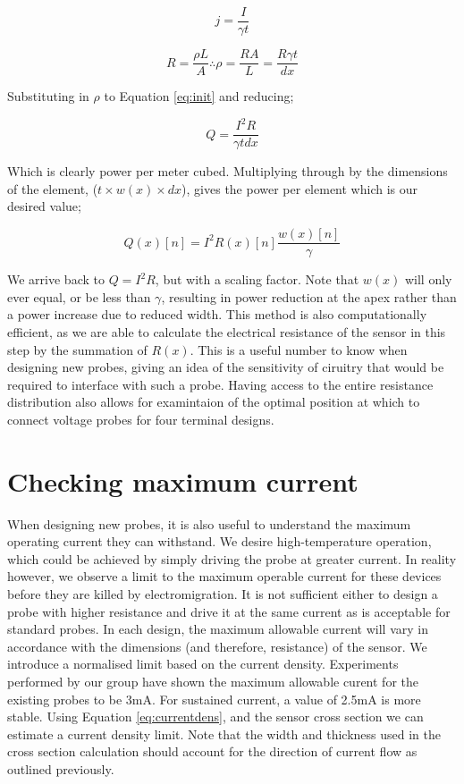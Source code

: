 \documentclass[]{report}
\begin{document}
\begin{equation}\label{eq:currentdens}
j=\frac{I}{\gamma t}
\end{equation}

\begin{equation}
R=\frac{\rho L}{A} \therefore \rho=\frac{RA}{L} = \frac{R \gamma t}{dx}
\end{equation}

Substituting in $\rho$ to Equation \ref{eq:init} and reducing;

\begin{equation}
Q  = \frac{I^2 R}{\gamma t dx}
\end{equation}

Which is clearly power per meter cubed. Multiplying through by the dimensions of the element, ($t \times w(x) \times dx $), gives the power per element which is our desired value;

\begin{equation}
Q(x)[n] = I^2R(x)[n]\frac{w(x)[n]}{\gamma}
\end{equation}

We arrive back to $Q=I^2R$, but with a scaling factor. Note that $w(x)$ will only ever equal, or be less than $\gamma$, resulting in power reduction at the apex rather than a power increase due to reduced width. This method is also computationally efficient, as we are able to calculate the electrical resistance of the sensor in this step by the summation of $R(x)$. This is a useful number to know when designing new probes, giving an idea of the sensitivity of ciruitry that would be required to interface with such a probe. Having access to the entire resistance distribution also allows for examintaion of the optimal position at which to connect voltage probes for four terminal designs.

\section{Checking maximum current}
When designing new probes, it is also useful to understand the maximum operating current they can withstand. We desire high-temperature operation, which could be achieved by simply driving the probe at greater current. In reality however, we observe a limit to the maximum operable current for these devices before they are killed by electromigration. It is not sufficient either to design a probe with higher resistance and drive it at the same current as is acceptable for standard probes. In each design, the maximum allowable current will vary in accordance with the dimensions (and therefore, resistance) of the sensor. We introduce a normalised limit based on the current density. Experiments performed by our group have shown the maximum allowable curent for the existing probes to be 3mA. For sustained current, a value of 2.5mA is more stable. Using Equation \ref{eq:currentdens}, and the sensor cross section we can estimate a current density limit. Note that the width and thickness used in the cross section calculation should account for the direction of current flow as outlined previously.
\end{document}
